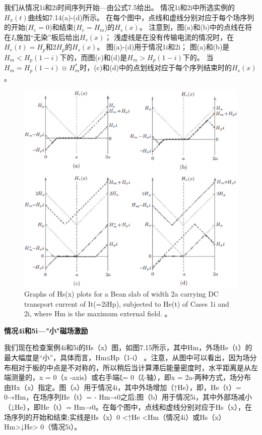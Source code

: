 我们从情况1i和2i时间序列开始---由公式7.5给出。
情况1i和2i中所选实例的$H_x(t)$曲线如7.14(a)-(d)所示。
在每个图中，点线和虚线分别对应于每个场序列的开始($H_e = 0$)和结束($H_e = H_m$)的$H_s(x)$。
注意到，图(a)和(b)中的点线在将在$I_t$施加“无染”板后给出$H_s(x)$；
浅虚线是在没有传输电流的情况时，在$H_e(t)=H_p$和$2H_p$的$H_s(x)$。
图(a)-(d)用于情况1i和2i； 图(a)和(b)是$H_m<H_p(1-i)$下的，而图(c)和(d)是$H_m> H_p(1-i)$下的。
当$H_m = H_p(1-i)\equiv H_m^*$时，(c)和(d)中的点划线对应于每个序列结束时的$H_s(x)$。
\begin{figure}[htbp]
	\centering
	\includegraphics[scale=0.7]{chpt7/figs/fig7.14.eps}
	\caption{Graphs of Hs(x) plots for a Bean slab of width 2a carrying DC transport
		current of It(=2iHp), subjected to He(t) of Cases 1i and 2i, where Hm is the maximum
		external field. 。}
\end{figure}

\textbf{情况4i和5i---"小"磁场激励}

我们现在检查案例4i和5i的Hs（x）图，如图7.15所示，其中Hm，外场He（t）的最大幅度是“小”，具体而言，Hm≤Hp（1-i） 。注意，从图中可以看出，因为场分布相对于板的中点是不对称的，所以稍后当计算滞后能量密度时，水平距离是从左端测量的，x = 0（x -axis）或右手端ξ= 0（ξ-轴），即x = 2a-两种方式，场分布由Hx（x）指定。图（a）用于情况4i，其中外场增加（↑He），即，He（t）= 0→Hm，在场序列He（t）=  -  Hm→0之后;图（b）用于情况5i，其中外部场减小（↓He），即He（t）= Hm→0。在每个图中，点线和虚线分别对应于Hs（x），在场序列的开始和结束;实线是Hs（x）0 <↑He <Hm（情况4i）或Hs（x）Hm>↓He> 0（情况5i）。

